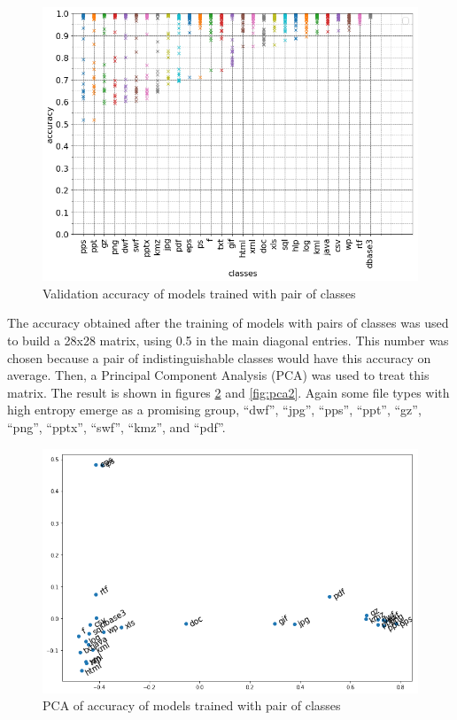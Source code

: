 \noindent
\begin{figure}[htb!]
\centering\includegraphics[width=1.0\textwidth]{content/dual.png}
\caption{\label{fig:dual}Validation accuracy of models trained with pair of classes}%
\end{figure}


The accuracy obtained after the training of models with pairs of classes was used to build a 28x28 matrix, using 0.5 in the main diagonal entries. This number was chosen because a pair of indistinguishable classes would have this accuracy on average. Then, a Principal Component Analysis (PCA) \cite{amirani_new_2008} was used to treat this matrix. The result is shown in figures \ref{fig:pca} and \ref{fig:pca2}. Again some file types with high entropy emerge as a promising group,  ``dwf'',
``jpg'',
``pps'',
``ppt'',
``gz'',
``png'',
``pptx'',
``swf'',
``kmz'',
and ``pdf''.

\noindent
\begin{figure}[htb!]
\centering\includegraphics[width=1.0\textwidth]{content/pca.png}
\caption{\label{fig:pca}PCA of accuracy of models trained with pair of classes}%
\end{figure}


